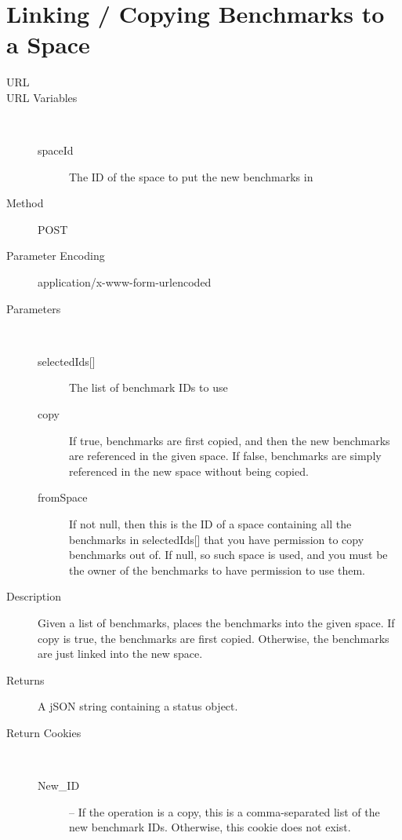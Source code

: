 \section{Linking / Copying Benchmarks to a Space}
\begin{description}
\item [URL] 
\item [URL Variables] \
	\begin{description}
	\item [spaceId]  The ID of the space to put the new benchmarks in
	\end{description}
\item [Method] POST
\item [Parameter Encoding] application/x-www-form-urlencoded
\item [Parameters] \
	\begin{description}
	\item [{selectedIds[]}]  The list of benchmark IDs to use
	\item [copy]  If true, benchmarks are first copied, and then the new benchmarks are referenced in the given space. If false, benchmarks are simply referenced in the new space without being copied.
	\item [fromSpace] \type{integer} If not null, then this is the ID of a space containing all the benchmarks in selectedIds[] that you have permission to copy benchmarks out of. If null, so such space is used, and you must be the owner of the benchmarks to have permission to use them.
	\end{description}
\item [Description] Given a list of benchmarks, places the benchmarks into the given space. If copy is true, the benchmarks are first copied. Otherwise, the benchmarks are just linked into the new space.
\item [Returns] A jSON string containing a status object.
\item [Return Cookies] \
	\begin{description}
	\item [New\_ID] \type{Integer} – If the operation is a copy, this is a comma-separated list of the new benchmark IDs. Otherwise, this cookie does not exist.
	\end{description}
\end{description}


